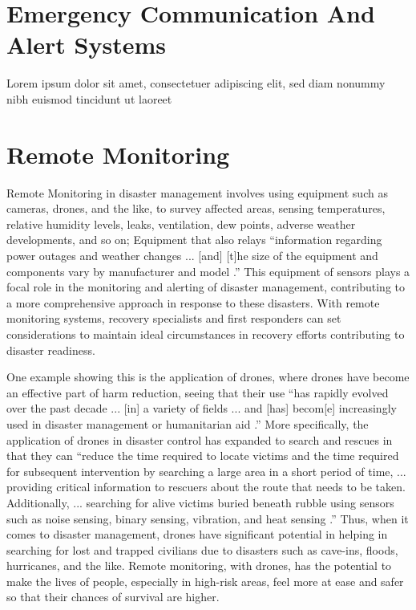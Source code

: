 \documentclass[conference]{IEEEtran}
\begin{document}
\section{Emergency Communication And Alert Systems} %

Lorem ipsum dolor sit amet, consectetuer adipiscing elit, sed diam nonummy nibh euismod tincidunt ut laoreet

\section{Remote Monitoring} %
Remote Monitoring in disaster management involves using equipment such as cameras, drones, and the like, 
to survey affected areas, sensing temperatures, relative humidity levels, leaks, ventilation, dew points, 
adverse weather developments, and so on; Equipment that also relays ``information regarding power outages 
and weather changes ... [and] [t]he size of the equipment and components vary by manufacturer and model 
\cite{b4}.'' This equipment of sensors plays a focal role in the monitoring and alerting of disaster 
management, contributing to a more comprehensive approach in response to these disasters. With remote 
monitoring systems, recovery specialists and first responders can set considerations to maintain ideal 
circumstances in recovery efforts contributing to disaster readiness.\par

One example showing this is the application of drones, where drones have become an effective part of harm
reduction, seeing that their use ``has rapidly evolved over the past decade ... [in] a variety of fields ... and [has] becom[e] increasingly used in disaster management or humanitarian aid \cite{b5}.'' More specifically, the application of drones in disaster control has expanded to search and rescues in that they can ``reduce the time required to locate victims and the time required for subsequent intervention by searching a large area in a short period of time, ... providing critical information to rescuers about the route that needs to be taken. Additionally, ... searching for alive victims buried beneath rubble using sensors such as noise sensing, binary sensing, vibration, and heat sensing \cite{b5}.'' Thus, when it comes to disaster management, drones have significant potential in helping in searching for lost and trapped civilians due to disasters such as cave-ins, floods, hurricanes, and the like. Remote monitoring, with drones, has the potential to make the lives of people, especially in high-risk areas, feel more at ease and safer so that their chances of survival are higher.\par
\end{document}
